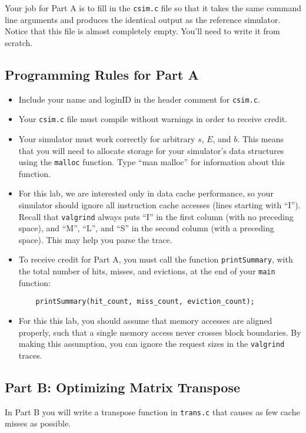\documentclass[11pt]{article}
\begin{document}
Your job for Part A is to fill in the {\tt csim.c} file so that
it takes the same command line arguments and produces the identical
output as the reference simulator. Notice that this file is almost
completely empty. You'll need to write it from scratch.

\subsection*{Programming Rules for Part A}

\begin{itemize}
\item Include your name and loginID in the header comment for {\tt csim.c}.

\item Your {\tt csim.c} file must compile without warnings in order
  to receive credit.

\item Your simulator must work correctly for arbitrary $s$, $E$, and
  $b$. This means that you will need to allocate storage for your
  simulator's data structures using the \verb:malloc: function. Type ``man
  malloc'' for information about this function.

\item For this lab, we are interested only in data cache performance,
  so your simulator should ignore all instruction cache accesses
  (lines starting with ``I''). Recall that {\tt valgrind} always puts
  ``I'' in the first column (with no preceding space), and ``M'',
  ``L'', and ``S'' in the second column (with a preceding space). This
  may help you parse the trace.

\item To receive credit for Part A,
  you must call the function {\tt printSummary}, with the total number
  of hits, misses, and evictions, at the end of your {\tt main}
  function:
\begin{verbatim}
    printSummary(hit_count, miss_count, eviction_count);
\end{verbatim}

\item For this this lab, you should assume that memory
  accesses are aligned properly, such that a single memory access
  never crosses block boundaries. By making this assumption, you can
  ignore the request sizes in the {\tt valgrind} traces.

\end{itemize}

\subsection{Part B: Optimizing Matrix Transpose}
In Part B you will write a transpose function in {\tt trans.c} that
causes as few cache misses as possible.
\end{document}
